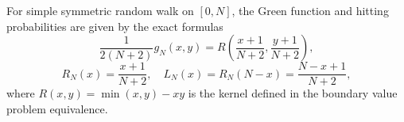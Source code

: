 For simple symmetric random walk on $[0,N]$, the Green function and hitting probabilities are given by the exact formulas
$$\frac{1}{2(N+2)} g_N(x,y) = R\left(\frac{x+1}{N+2}, \frac{y+1}{N+2}\right),$$
$$R_N(x) = \frac{x+1}{N+2}, \quad L_N(x) = R_N(N-x) = \frac{N-x+1}{N+2},$$
where $R(x,y) = \min(x,y) - xy$ is the kernel defined in the boundary value problem equivalence.
